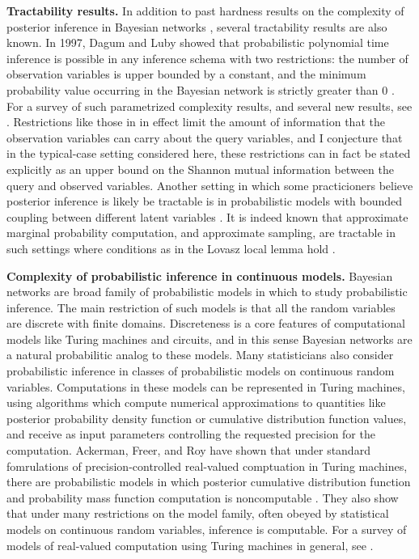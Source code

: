 \documentclass{article}
\theoremstyle{definition}
\theoremstyle{remark}
\begin{document}
\textbf{Tractability results.}
In addition to past hardness results on the complexity of posterior inference in Bayesian networks \cite{cooper1990,dagum1993}, several tractability results are also known.
In 1997, Dagum and Luby showed that probabilistic polynomial time inference is possible in any inference schema with two restrictions: the number of observation variables is upper bounded by a constant, and the minimum probability value occurring in the Bayesian network is strictly greater than $0$ \cite{dagum1997optimal}.
For a survey of such parametrized complexity results, and several new results, see \cite{kwisthout2018approximate}.
Restrictions like those in \cite{dagum1997optimal} in effect limit the amount of information that the observation variables can carry about the query variables,
and I conjecture that in the typical-case setting considered here, these restrictions can in fact be stated explicitly as an upper bound on the Shannon mutual information between the query and observed variables.
Another setting in which some practicioners believe posterior inference is likely be tractable is in probabilistic models with bounded coupling between different latent variables \cite{freer2010probabilistic}.
It is indeed known that approximate marginal probability computation, and approximate sampling, are tractable in such settings where conditions as in the Lovasz local lemma hold \cite{moitra2019approximate}.

\textbf{Complexity of probabilistic inference in continuous models.}
Bayesian networks are broad family of probabilistic models in which to study probabilistic inference.
The main restriction of such models is that all the random variables are discrete with finite domains.
Discreteness is a core features of computational models like Turing machines and circuits, and in this sense Bayesian networks are a natural probabilitic analog to these models.
Many statisticians also consider probabilistic inference in classes of probabilistic models on continuous random variables.
Computations in these models can be represented in Turing machines, using algorithms which compute numerical approximations to quantities like posterior probability density function or cumulative distribution function values, and receive as input parameters controlling the requested precision for the computation.
Ackerman, Freer, and Roy have shown that under standard fomrulations of precision-controlled real-valued comptuation in Turing machines,
there are probabilistic models in which posterior cumulative distribution function and probability mass function computation is noncomputable \cite{ackerman2019computability}.
They also show that under many restrictions on the model family, often obeyed by statistical models on continuous random variables, inference is computable.
For a survey of models of real-valued computation using Turing machines in general, see \cite{weihrauch2012computable}.
\end{document}
